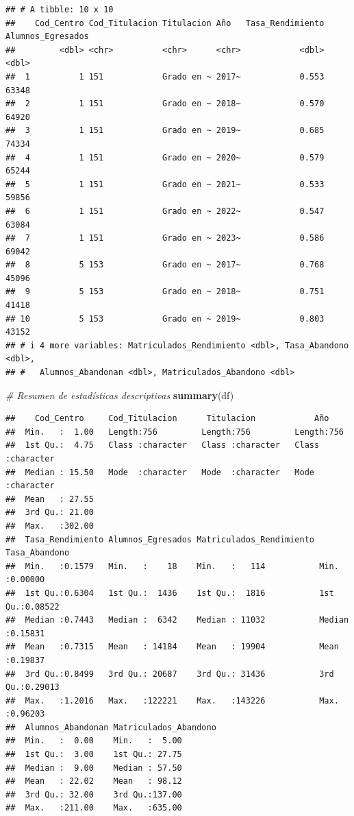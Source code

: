 \documentclass[
]{article}
\newenvironment{Shaded}{\begin{snugshade}}{\end{snugshade}}
\newcommand{\CommentTok}[1]{\textcolor[rgb]{0.56,0.35,0.01}{\textit{#1}}}
\newcommand{\FunctionTok}[1]{\textcolor[rgb]{0.13,0.29,0.53}{\textbf{#1}}}
\newcommand{\NormalTok}[1]{#1}
\begin{document}
\begin{verbatim}
## # A tibble: 10 x 10
##    Cod_Centro Cod_Titulacion Titulacion Año   Tasa_Rendimiento Alumnos_Egresados
##         <dbl> <chr>          <chr>      <chr>            <dbl>             <dbl>
##  1          1 151            Grado en ~ 2017~            0.553             63348
##  2          1 151            Grado en ~ 2018~            0.570             64920
##  3          1 151            Grado en ~ 2019~            0.685             74334
##  4          1 151            Grado en ~ 2020~            0.579             65244
##  5          1 151            Grado en ~ 2021~            0.533             59856
##  6          1 151            Grado en ~ 2022~            0.547             63084
##  7          1 151            Grado en ~ 2023~            0.586             69042
##  8          5 153            Grado en ~ 2017~            0.768             45096
##  9          5 153            Grado en ~ 2018~            0.751             41418
## 10          5 153            Grado en ~ 2019~            0.803             43152
## # i 4 more variables: Matriculados_Rendimiento <dbl>, Tasa_Abandono <dbl>,
## #   Alumnos_Abandonan <dbl>, Matriculados_Abandono <dbl>
\end{verbatim}

\begin{Shaded}
\begin{Highlighting}[]
\CommentTok{\# Resumen de estadísticas descriptivas}
\FunctionTok{summary}\NormalTok{(df)}
\end{Highlighting}
\end{Shaded}

\begin{verbatim}
##    Cod_Centro     Cod_Titulacion      Titulacion            Año           
##  Min.   :  1.00   Length:756         Length:756         Length:756        
##  1st Qu.:  4.75   Class :character   Class :character   Class :character  
##  Median : 15.50   Mode  :character   Mode  :character   Mode  :character  
##  Mean   : 27.55                                                           
##  3rd Qu.: 21.00                                                           
##  Max.   :302.00                                                           
##  Tasa_Rendimiento Alumnos_Egresados Matriculados_Rendimiento Tasa_Abandono    
##  Min.   :0.1579   Min.   :    18    Min.   :   114           Min.   :0.00000  
##  1st Qu.:0.6304   1st Qu.:  1436    1st Qu.:  1816           1st Qu.:0.08522  
##  Median :0.7443   Median :  6342    Median : 11032           Median :0.15831  
##  Mean   :0.7315   Mean   : 14184    Mean   : 19904           Mean   :0.19837  
##  3rd Qu.:0.8499   3rd Qu.: 20687    3rd Qu.: 31436           3rd Qu.:0.29013  
##  Max.   :1.2016   Max.   :122221    Max.   :143226           Max.   :0.96203  
##  Alumnos_Abandonan Matriculados_Abandono
##  Min.   :  0.00    Min.   :  5.00       
##  1st Qu.:  3.00    1st Qu.: 27.75       
##  Median :  9.00    Median : 57.50       
##  Mean   : 22.02    Mean   : 98.12       
##  3rd Qu.: 32.00    3rd Qu.:137.00       
##  Max.   :211.00    Max.   :635.00
\end{verbatim}
\end{document}
